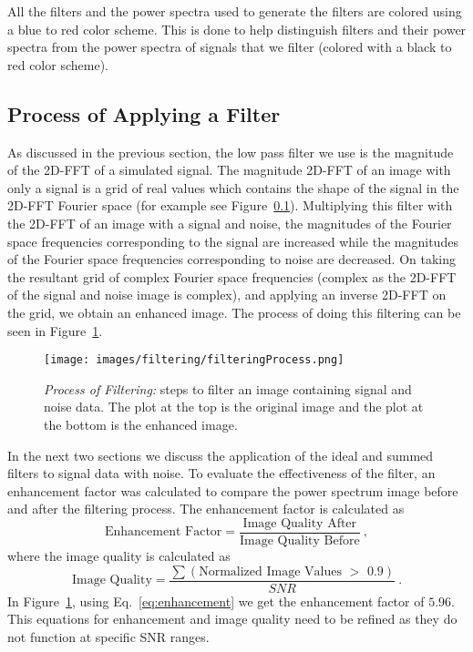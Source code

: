 \documentclass[%
reprint,
amsmath,amssymb,
aps,
]{revtex4-1}
\begin{document}
	All the filters and the power spectra used to generate the filters are colored using a blue to red color scheme. This is done to help distinguish filters and their power spectra from the power spectra of signals that we filter (colored with a black to red color scheme).
	
	\subsection{Process of Applying a Filter}
	As discussed in the previous section, the low pass filter we use is the magnitude of the 2D-FFT of a simulated signal. The magnitude 2D-FFT of an image with only a signal is a grid of real values which contains the shape of the signal in the 2D-FFT Fourier space (for example see Figure~\ref{}). Multiplying this filter with the 2D-FFT of an image with a signal and noise, the magnitudes of the Fourier space frequencies corresponding to the signal are increased while the magnitudes of the Fourier space frequencies corresponding to noise are decreased. On taking the resultant grid of complex Fourier space frequencies (complex as the 2D-FFT of the signal and noise image is complex), and applying an inverse 2D-FFT on the grid, we obtain an enhanced image. The process of doing this filtering can be seen in Figure~\ref{fig:filteringProcess}. 
	
	\begin{figure}[h]
		\centering
		\texttt{[image: images/filtering/filteringProcess.png]}
		\caption{\textit{Process of Filtering:} steps to filter an image containing signal and noise data. The plot at the top is the original image and the plot at the bottom is the enhanced image.}
		\label{fig:filteringProcess}
	\end{figure}
	
	In the next two sections we discuss the application of the ideal and summed filters to signal data with noise. To evaluate the effectiveness of the filter, an enhancement factor was calculated to compare the power spectrum image before and after the filtering process. The enhancement factor is calculated as 
	\begin{equation}\label{eq:enhancement}
	\text{Enhancement Factor} = \frac{\text{Image Quality After}}{\text{Image Quality Before}} \ ,
	\end{equation} 
	where the image quality is calculated as 
	\begin{equation}\label{eq:imageQual}
	\text{Image Quality} = \frac{\sum(\text{Normalized Image Values $>$ 0.9})}{SNR} \ .
	\end{equation}
	In Figure~\ref{fig:filteringProcess}, using Eq.~\ref{eq:enhancement} we get the enhancement factor of $5.96$. This equations for enhancement and image quality need to be refined as they do not function at specific SNR ranges. 
	
\end{document}
